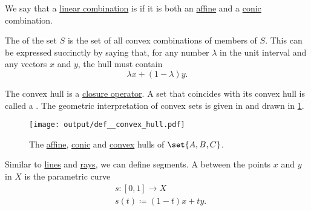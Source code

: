 \begin{definition}\label{def:convex_hull}\mimprovised
  We say that a \hyperref[rem:linear_combinations]{linear combination} is  if it is both an \hyperref[def:affine_hull]{affine} and a \hyperref[def:conic_hull]{conic} combination.

  The  of the set \( S \) is the set of all convex combinations of members of \( S \). This can be expressed succinctly by saying that, for any number \( \lambda \) in the unit interval and any vectors \( x \) and \( y \), the hull must contain
  \begin{equation}\label{eq:def:convex_hull/combination}
    \lambda x + (1 - \lambda) y.
  \end{equation}

  The convex hull is a \hyperref[def:closure_operator]{closure operator}. A set that coincides with its convex hull is called a . The geometric interpretation of convex sets is given in  and drawn in \cref{fig:def:convex_hull}.

  \begin{figure}[!ht]
    \centering
    \texttt{[image: output/def\_\_convex\_hull.pdf]}
    \caption{The \hyperref[def:affine_hull]{affine}, \hyperref[def:conic_hull]{conic} and \hyperref[def:convex_hull]{convex} hulls of \( \set{ A, B, C } \).}\label{fig:def:convex_hull}
  \end{figure}
\end{definition}

\begin{definition}\label{def:line_segment}
  Similar to \hyperref[def:geometric_line]{lines} and \hyperref[def:geometric_ray]{rays}, we can define segments. A  between the points \( x \) and \( y \) in \( X \) is the parametric curve
  \begin{equation*}
    \begin{aligned}
       &s: [0, 1] \to X \\
       &s(t) \coloneqq (1 - t) x + t y.
    \end{aligned}
  \end{equation*}
\end{definition}

